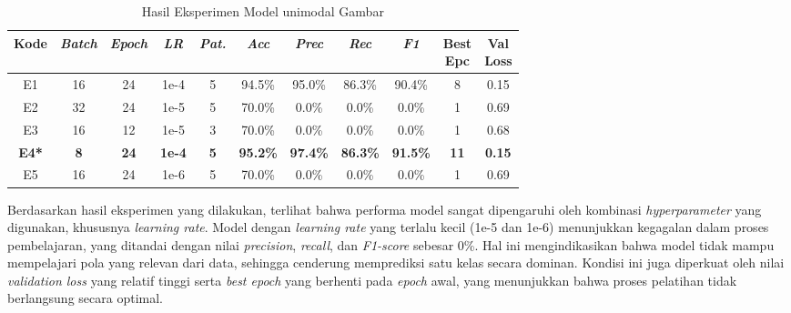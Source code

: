 \begin{table}[H]
    \centering
    \caption{Hasil Eksperimen Model unimodal Gambar}
    \label{table:4.gambar_eksperimen}
    \small
    \setlength{\tabcolsep}{2pt} 
    \renewcommand{\arraystretch}{1.1}
    
  
        \begin{tabular}{ccccccccccc}
            \hline
            \textbf{Kode} & \textbf{\textit{Batch}} & \textbf{\textit{Epoch}} & \textbf{\textit{LR}} & \textbf{\textit{Pat.}} & \textbf{\textit{Acc}} & \textbf{\textit{Prec}} & \textbf{\textit{Rec}} & \textbf{\textit{F1}} & \shortstack{\textbf{Best}\\\textbf{Epc}} & \shortstack{\textbf{Val}\\\textbf{Loss}} \\
            \hline
            E1 & 16 & 24 & 1e-4 & 5 & 94.5\% & 95.0\% & 86.3\% & 90.4\% & 8 & 0.15 \\
            E2 & 32 & 24 & 1e-5 & 5 & 70.0\% & 0.0\% & 0.0\% & 0.0\% & 1 & 0.69 \\
            E3 & 16 & 12 & 1e-5 & 3 & 70.0\% & 0.0\% & 0.0\% & 0.0\% & 1 & 0.68 \\
            \textbf{E4*} & \textbf{8} & \textbf{24} & \textbf{1e-4} & \textbf{5} & \textbf{95.2\%} & \textbf{97.4\%} & \textbf{86.3\%} & \textbf{91.5\%} & \textbf{11} & \textbf{0.15} \\
            E5 & 16 & 24 & 1e-6 & 5 & 70.0\% & 0.0\% & 0.0\% & 0.0\% & 1 & 0.69 \\
            \hline
        \end{tabular}
    
\end{table}


Berdasarkan hasil eksperimen yang dilakukan, terlihat bahwa performa model sangat dipengaruhi oleh kombinasi \textit{hyperparameter} yang digunakan, khususnya \textit{learning rate}. Model dengan \textit{learning rate} yang terlalu kecil (1e-5 dan 1e-6) menunjukkan kegagalan dalam proses pembelajaran, yang ditandai dengan nilai \textit{precision}, \textit{recall}, dan \textit{F1-score} sebesar 0\%. Hal ini mengindikasikan bahwa model tidak mampu mempelajari pola yang relevan dari data, sehingga cenderung memprediksi satu kelas secara dominan. Kondisi ini juga diperkuat oleh nilai \textit{validation loss} yang relatif tinggi serta \textit{best epoch} yang berhenti pada \textit{epoch} awal, yang menunjukkan bahwa proses pelatihan tidak berlangsung secara optimal.

